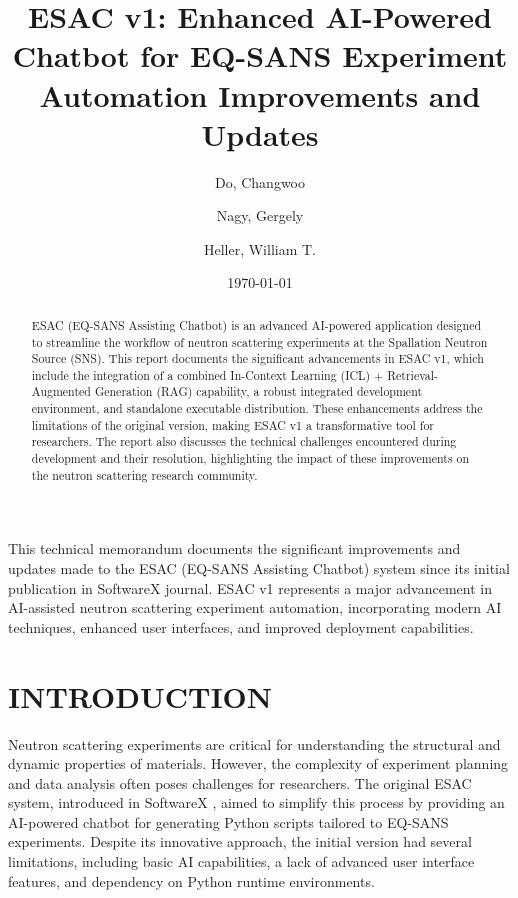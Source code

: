 \documentclass[tm]{ornltm} %
\author{Do, Changwoo \and Nagy, Gergely \and Heller, William T.}
\title{ESAC v1: Enhanced AI-Powered Chatbot for EQ-SANS Experiment Automation Improvements and Updates}
\date{\today}
\begin{document}
\frontmatter

\tableofcontents

\begingroup
 \renewcommand*{\addvspace}[1]{}
    \listoffigures
    \listoftables
\endgroup

\printacronyms

\begin{foreword}

This technical memorandum documents the significant improvements and updates made to the ESAC (EQ-SANS Assisting Chatbot) system since its initial publication in SoftwareX journal. ESAC v1 represents a major advancement in AI-assisted neutron scattering experiment automation, incorporating modern AI techniques, enhanced user interfaces, and improved deployment capabilities.

\end{foreword}

\mainmatter
\begin{abstract}
ESAC (EQ-SANS Assisting Chatbot) is an advanced AI-powered application designed to streamline the workflow of neutron scattering experiments at the Spallation Neutron Source (SNS). This report documents the significant advancements in ESAC v1, which include the integration of a combined In-Context Learning (ICL) + Retrieval-Augmented Generation (RAG) capability, a robust integrated development environment, and standalone executable distribution. These enhancements address the limitations of the original version, making ESAC v1 a transformative tool for researchers. The report also discusses the technical challenges encountered during development and their resolution, highlighting the impact of these improvements on the neutron scattering research community.
\end{abstract}

\acresetall

\section{INTRODUCTION}
\label{sec:intro}

Neutron scattering experiments are critical for understanding the structural and dynamic properties of materials. However, the complexity of experiment planning and data analysis often poses challenges for researchers. The original ESAC system, introduced in SoftwareX \autocite{esac_original}, aimed to simplify this process by providing an AI-powered chatbot for generating Python scripts tailored to EQ-SANS experiments. Despite its innovative approach, the initial version had several limitations, including basic AI capabilities, a lack of advanced user interface features, and dependency on Python runtime environments.
\end{document}
